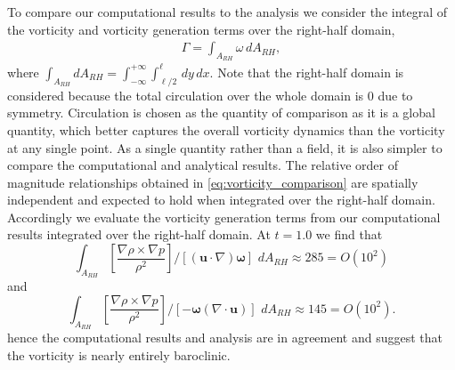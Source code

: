 \documentclass{jfm}%
\newcommand{\orderof}[1]{\ensuremath{\textit{O}\left(#1\right)}}
\begin{document}
To compare our computational results to the analysis we consider the
integral of the vorticity and vorticity generation terms over the
right-half domain,
\begin{align}
  \Gamma = \int_{A_{RH}} \omega \,dA_{RH},
\end{align}
where
$\int_{A_{RH}} dA_{RH} =
\int_{-\infty}^{+\infty}\int_{\ell/2}^{\ell} \,dy\, dx$. Note
that the right-half domain is considered because the total circulation
over the whole domain is $0$ due to symmetry. Circulation is chosen as
the quantity of comparison as it is a global quantity, which better
captures the overall vorticity dynamics than the vorticity at any
single point. As a single quantity rather than a field, it is also
simpler to compare the computational and analytical results. The
relative order of magnitude relationships obtained in
\eqref{eq:vorticity_comparison} are spatially independent and expected
to hold when integrated over the right-half domain. Accordingly we
evaluate the vorticity generation terms from our computational results
integrated over the right-half domain. At $t=1.0$ we find that %
$$ \int_{A_{RH}} \left[\frac{\nabla\rho\times\nabla p}{\rho^2}\right] / \left[\left(\boldsymbol{u}\cdot\nabla\right)\boldsymbol{\omega}\right]\,\,dA_{RH}\approx 285=\orderof{10^2}$$
and
$$ \int_{A_{RH}} \left[\frac{\nabla\rho\times\nabla p}{\rho^2}\right] / \left[-\boldsymbol{\omega}\left(\nabla\cdot\boldsymbol{u}\right)\right]\,\,dA_{RH} \approx 145=\orderof{10^2}.$$
%
hence the computational results and analysis are in agreement and suggest
that the vorticity is nearly entirely baroclinic.
% 
\end{document}
